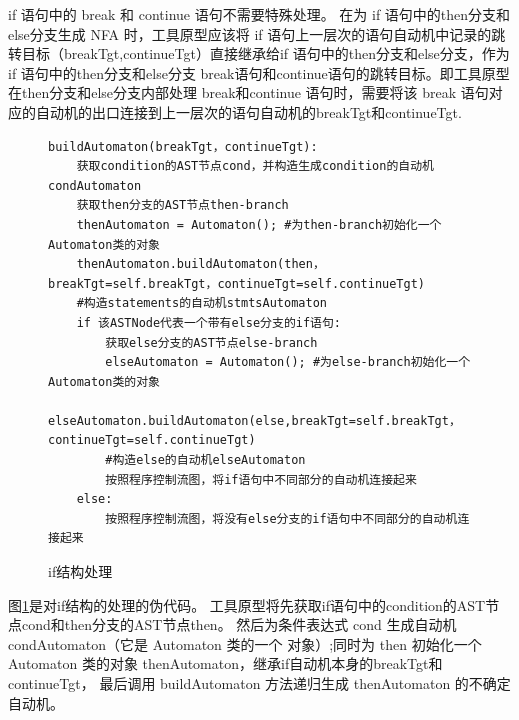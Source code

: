 if 语句中的 break 和 continue 语句不需要特殊处理。
在为 if 语句中的then分支和else分支生成 NFA 时，工具原型应该将 if 语句上一层次的语句自动机中记录的跳转目标（breakTgt,continueTgt）直接继承给if 语句中的then分支和else分支，作为 if 语句中的then分支和else分支 break语句和continue语句的跳转目标。即工具原型在then分支和else分支内部处理 break和continue 语句时，需要将该 break 语句对应的自动机的出口连接到上一层次的语句自动机的breakTgt和continueTgt.

\begin{figure}[ht]
	\centering
\begin{minipage}{16cm}
\begin{lstlisting}
buildAutomaton(breakTgt，continueTgt): 
    获取condition的AST节点cond，并构造生成condition的自动机condAutomaton
    获取then分支的AST节点then-branch
    thenAutomaton = Automaton(); #为then-branch初始化一个Automaton类的对象
    thenAutomaton.buildAutomaton(then，breakTgt=self.breakTgt，continueTgt=self.continueTgt)    
    #构造statements的自动机stmtsAutomaton
    if 该ASTNode代表一个带有else分支的if语句:
        获取else分支的AST节点else-branch
        elseAutomaton = Automaton(); #为else-branch初始化一个Automaton类的对象
        elseAutomaton.buildAutomaton(else,breakTgt=self.breakTgt，continueTgt=self.continueTgt)    
        #构造else的自动机elseAutomaton
        按照程序控制流图，将if语句中不同部分的自动机连接起来
    else:
        按照程序控制流图，将没有else分支的if语句中不同部分的自动机连接起来
\end{lstlisting}
\end{minipage}
    \caption{if结构处理}
    \label{if结构处理}
\end{figure}

图\ref{if结构处理}是对if结构的处理的伪代码。
工具原型将先获取if语句中的condition的AST节点cond和then分支的AST节点then。
然后为条件表达式 cond 生成自动机 condAutomaton（它是 Automaton 类的一个
对象）;同时为 then 初始化一个 Automaton 类的对象 thenAutomaton，继承if自动机本身的breakTgt和continueTgt，
最后调用 buildAutomaton 方法递归生成 thenAutomaton 的不确定自动机。

